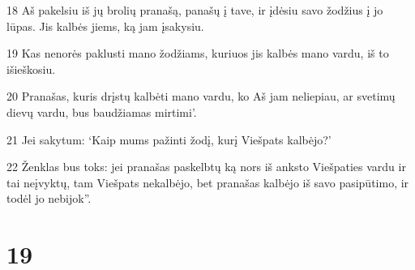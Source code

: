 \par 18 Aš pakelsiu iš jų brolių pranašą, panašų į tave, ir įdėsiu savo žodžius į jo lūpas. Jis kalbės jiems, ką jam įsakysiu. 
\par 19 Kas nenorės paklusti mano žodžiams, kuriuos jis kalbės mano vardu, iš to išieškosiu. 
\par 20 Pranašas, kuris drįstų kalbėti mano vardu, ko Aš jam neliepiau, ar svetimų dievų vardu, bus baudžiamas mirtimi’. 
\par 21 Jei sakytum: ‘Kaip mums pažinti žodį, kurį Viešpats kalbėjo?’ 
\par 22 Ženklas bus toks: jei pranašas paskelbtų ką nors iš anksto Viešpaties vardu ir tai neįvyktų, tam Viešpats nekalbėjo, bet pranašas kalbėjo iš savo pasipūtimo, ir todėl jo nebijok”.



\chapter{19}


